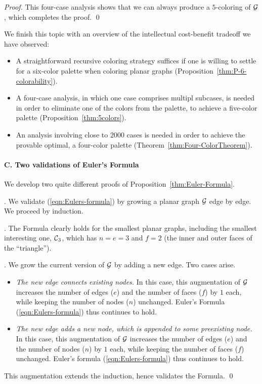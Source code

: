 {\begin{proof}
This four-case analysis shows that we can always produce a
$5$-coloring of $\mbox{$\cal G$}$, which completes the proof.  \qed
\end{proof}
}

We finish this topic with an overview of the intellectual
cost-benefit tradeoff we have observed:
\begin{itemize}
\item
A straightforward recursive coloring strategy suffices if one is
willing to settle for a six-color palette when coloring planar graphs
(Proposition~\ref{thm:P-6-colorability}).
\item
A four-case analysis, in which one case comprises multipl subcases, is
needed in order to eliminate one of the colors from the palette, to
achieve a five-color palette (Proposition~\ref{thm:5colors}).
\item
An analysis involving close to $2000$ cases is needed in order to
achieve the provable optimal, a four-color palette
(Theorem~\ref{thm:Four-ColorTheorem}).
\end{itemize}

\paragraph{\small\sf C. Two validations of Euler's Formula}

We develop two quite different proofs of
Proposition~\ref{thm:Euler-Formula}.

\medskip

.  We
validate (\ref{eqn:Eulers-formula}) by growing a planar graph $\mbox{$\cal G$}$
edge by edge.  We proceed by induction.

\smallskip

.
The Formula clearly holds for the smallest planar graphs, including
the smallest interesting one, $\mbox{$\cal C$}_3$, which has $n = e = 3$ and $f =2$
(the inner and outer faces of the ``triangle'').

\smallskip

.
We grow the current version of $\mbox{$\cal G$}$ by adding a new edge.  Two cases
arise.
\begin{itemize}
\item
{\em The new edge connects existing nodes.}  In this case, this
augmentation of $\mbox{$\cal G$}$ increases the number of edges ($e$) and the
number of faces ($f$) by $1$ each, while keeping the number of nodes
($n$) unchanged.  Euler's Formula (\ref{eqn:Eulers-formula}) thus
continues to hold.

\item
{\em The new edge adds a new node, which is appended to some
  preexisting node.}  In this case, this augmentation of $\mbox{$\cal G$}$
increases the number of edges ($e$) and the number of nodes ($n$) by
$1$ each, while keeping the number of faces ($f$) unchanged.  Euler's
formula (\ref{eqn:Eulers-formula}) thus continues to hold.
\end{itemize}
This augmentation extends the induction, hence validates the Formula.
\qed


